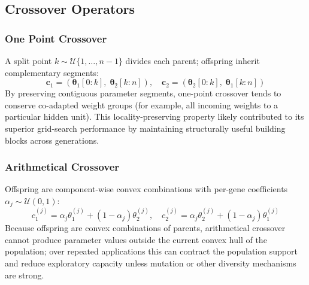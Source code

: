 \documentclass[12pt, a4paper]{article}
\begin{document}
\subsection{Crossover Operators}

\subsubsection{One Point Crossover}
A split point $k \sim \mathcal{U}\{1,\ldots,n{-}1\}$ divides each parent; offspring inherit complementary segments:
\[
\mathbf{c}_1 = (\boldsymbol{\theta}_1[0:k],\;\boldsymbol{\theta}_2[k:n]), \quad \mathbf{c}_2 = (\boldsymbol{\theta}_2[0:k],\;\boldsymbol{\theta}_1[k:n])
\]
By preserving contiguous parameter segments, one-point crossover tends to conserve co-adapted weight groups (for example, all incoming weights to a particular hidden unit). This locality-preserving property likely contributed to its superior grid-search performance by maintaining structurally useful building blocks across generations.

\subsubsection{Arithmetical Crossover}
Offspring are component-wise convex combinations with per-gene coefficients $\alpha_j \sim \mathcal{U}(0,1)$:
\[
c_1^{(j)} = \alpha_j\theta_1^{(j)} + (1{-}\alpha_j)\theta_2^{(j)}, \quad c_2^{(j)} = \alpha_j\theta_2^{(j)} + (1{-}\alpha_j)\theta_1^{(j)}
\]
Because offspring are convex combinations of parents, arithmetical crossover cannot produce parameter values outside the current convex hull of the population; over repeated applications this can contract the population support and reduce exploratory capacity unless mutation or other diversity mechanisms are strong.
\end{document}
